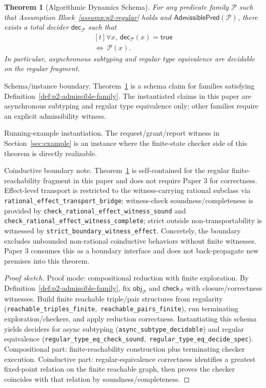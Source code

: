 \documentclass[a4paper,10pt,twocolumn,english]{article}
\numberwithin{equation}{section}
\theoremstyle{paperdef}
\theoremstyle{paperplain}
\newtheorem{theorem}[definition]{Theorem}
\theoremstyle{paperdef}
\theoremstyle{paperremark}
\begin{document}
\begin{theorem}[Algorithmic Dynamics Schema]
	\label{thm:algorithmic}
	For any predicate family $\mathcal{P}$ such that
	Assumption Block~\ref{assump:p2-regular} holds and
	$\mathsf{AdmissiblePred}(\mathcal{P})$, there exists a total decider
	$\mathsf{dec}_{\mathcal{P}}$ such that
	\begin{equation}
		\begin{aligned}[t]
			\forall x,\ \mathsf{dec}_{\mathcal{P}}(x) = \mathsf{true}
			\\
			\iff\ \mathcal{P}(x).
		\end{aligned}
	\end{equation}
	In particular, asynchronous subtyping and regular type equivalence are decidable on the regular fragment.
\end{theorem}

Schema/instance boundary. Theorem~\ref{thm:algorithmic} is a schema claim for
families satisfying Definition~\ref{def:p2-admissible-family}. The instantiated
claims in this paper are asynchronous subtyping and regular type equivalence
only; other families require an explicit admissibility witness.

Running-example instantiation. The request/grant/report witness in
Section~\ref{sec:example} is an instance where the finite-state checker side of
this theorem is directly realizable.

Coinductive boundary note. Theorem~\ref{thm:algorithmic} is self-contained for
the regular finite-reachability fragment in this paper and does not require
Paper 3 for correctness. Effect-level transport is restricted to the
witness-carrying rational subclass via
\nolinkurl{rational_effect_transport_bridge}; witness-check
soundness/completeness is provided by
\nolinkurl{check_rational_effect_witness_sound} and
\nolinkurl{check_rational_effect_witness_complete}; strict outside
non-transportability is witnessed by
\nolinkurl{strict_boundary_witness_effect}. Concretely, the boundary excludes
unbounded non-rational coinductive behaviors without finite witnesses. Paper 3
consumes this as a boundary interface and does not back-propagate new premises
into this theorem.

\begin{proof}[Proof sketch]
	Proof mode: compositional reduction with finite exploration. By Definition~\ref{def:p2-admissible-family}, fix $\mathsf{obj}_{\mathcal{P}}$ and $\mathsf{check}_{\mathcal{P}}$ with closure/correctness witnesses. Build finite reachable triple/pair structures from regularity (\nolinkurl{reachable_triples_finite},\allowbreak\ \nolinkurl{reachable_pairs_finite}), run terminating exploration/checkers, and apply reduction correctness. Instantiating this schema yields deciders for async subtyping (\nolinkurl{async_subtype_decidable}) and regular equivalence (\nolinkurl{regular_type_eq_check_sound},\allowbreak\ \nolinkurl{regular_type_eq_decide_spec}).
	Compositional part: finite-reachability construction plus terminating checker
	execution. Coinductive part: regular-equivalence correctness identifies a
	greatest fixed-point relation on the finite reachable graph, then proves the
	checker coincides with that relation by soundness/completeness.
\end{proof}
\end{document}
